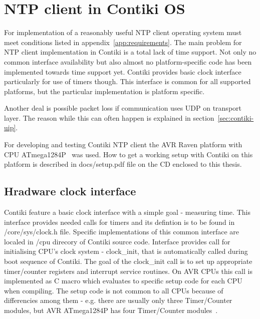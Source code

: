 
\chapter{NTP client in Contiki OS}

For implementation of a reasonably useful NTP client
operating system must meet conditions listed in appendix~\ref{app:requirements}.
The main problem for NTP client implementation in Contiki is a total
lack of time support.
Not only no common interface availability but also
almost no platform-specific code has been implemented towards time support yet.
Contiki provides basic clock interface particularly for use of timers though.
This interface is common for all supported platforms,
but the particular implementation is platform specific.

Another deal is possible packet loss if communication uses UDP on transport layer.
The reason while this can often happen is explained in section~\ref{sec:contiki-uip}.

For developing and testing Contiki NTP client the AVR Raven platform with CPU ATmega1284P~\cite{avr-datasheet} was used.
How to get a working setup with Contiki on this platform is described in
docs/setup.pdf file on the CD enclosed to this thesis.

\section{Hradware clock interface}
Contiki feature a basic clock interface with a simple goal - measuring time.
This interface provides needed calls for timers and its defintion is to be found in /core/sys/clock.h file.
Specific implementations of this common interface are localed in /cpu direcory of Contiki source code.
Interface provides call for initialising CPU's clock system - clock\_init, that is automatically called during
boot sequence of Contiki.
The goal of the clock\_init call is to set up
appropriate timer/counter registers and interrupt service routines.
On AVR CPUs this call is implemented as C macro which evaluates to specific setup code for each CPU
when compiling.
The setup code is not common to all CPUs because of differencies among them - e.g. there are usually
only three Timer/Counter modules, but AVR ATmega1284P has four Timer/Counter modules~\cite{avr-datasheet}.

